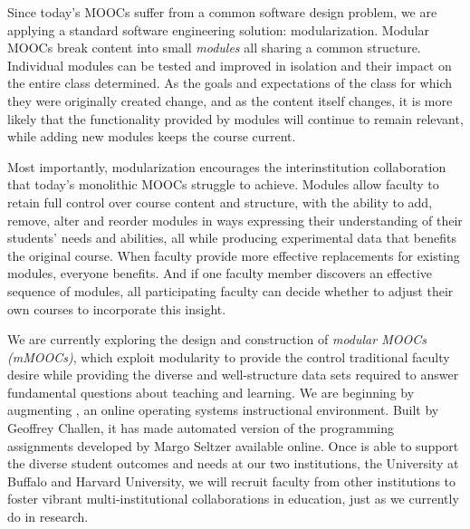 Since today's MOOCs suffer from a common software design problem, we are
applying a standard software engineering solution: modularization. Modular
MOOCs break content into small \textit{modules} all sharing a common
structure. Individual modules can be tested and improved in isolation and
their impact on the entire class determined. As the goals and expectations of
the class for which they were originally created change, and as the content
itself changes, it is more likely that the functionality provided by modules
will continue to remain relevant, while adding new modules keeps the course
current.

Most importantly, modularization encourages the interinstitution
collaboration that today's monolithic MOOCs struggle to achieve. Modules
allow faculty to retain full control over course content and structure, with
the ability to add, remove, alter and reorder modules in ways expressing
their understanding of their students' needs and abilities, all while
producing experimental data that benefits the original course. When faculty
provide more effective replacements for existing modules, everyone benefits.
And if one faculty member discovers an effective sequence of modules, all
participating faculty can decide whether to adjust their own courses to
incorporate this insight.

We are currently exploring the design and construction of \textit{modular
MOOCs (mMOOCs)}, which exploit modularity to provide the control traditional
faculty desire while providing the diverse and well-structure data sets
required to answer fundamental questions about teaching and learning. We are
beginning by augmenting \opsclass{}, an online operating systems
instructional environment. Built by Geoffrey Challen, it has made automated
version of the programming assignments developed by Margo Seltzer available
online. Once \opsclass{} is able to support the diverse student outcomes and
needs at our two institutions, the University at Buffalo and Harvard
University, we will recruit faculty from other institutions to foster vibrant
multi-institutional collaborations in education, just as we currently do in
research.

\vspace*{-1in}


